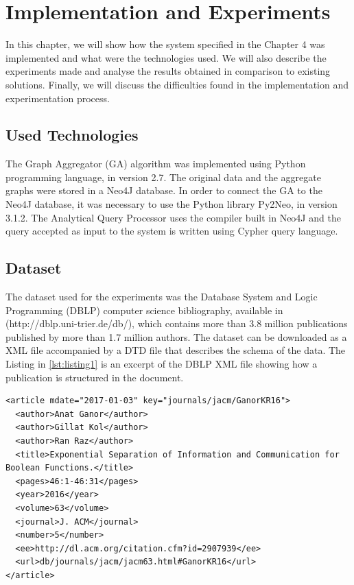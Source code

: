 \chapter{Implementation and Experiments}

In this chapter, we will show how the system specified in the Chapter 4 was implemented and what were the technologies used. We will also describe the experiments made and analyse the results obtained in comparison to existing solutions. Finally, we will discuss the difficulties found in the implementation and experimentation process.

\section{Used Technologies}

The Graph Aggregator (GA) algorithm was implemented using Python programming language, in version 2.7. The original data and the aggregate graphs were stored in a Neo4J database. In order to connect the GA to the Neo4J database, it was necessary to use the Python library Py2Neo, in version 3.1.2. The Analytical Query Processor uses the compiler built in Neo4J and the query accepted as input to the system is written using Cypher query language.

\section{Dataset}

The dataset used for the experiments was the Database System and Logic Programming (DBLP) computer science bibliography, available in (http://dblp.uni-trier.de/db/), which contains more than 3.8 million publications published by more than 1.7 million authors. The dataset can be downloaded as a XML file accompanied by a DTD file that describes the schema of the data. The Listing in \ref{lst:listing1} is an excerpt of the DBLP XML file showing how a publication is structured in the document.


\begin{lstlisting}
<article mdate="2017-01-03" key="journals/jacm/GanorKR16">
  <author>Anat Ganor</author>
  <author>Gillat Kol</author>
  <author>Ran Raz</author>
  <title>Exponential Separation of Information and Communication for Boolean Functions.</title>
  <pages>46:1-46:31</pages>
  <year>2016</year>
  <volume>63</volume>
  <journal>J. ACM</journal>
  <number>5</number>
  <ee>http://dl.acm.org/citation.cfm?id=2907939</ee>
  <url>db/journals/jacm/jacm63.html#GanorKR16</url>
</article>
\end{lstlisting}

